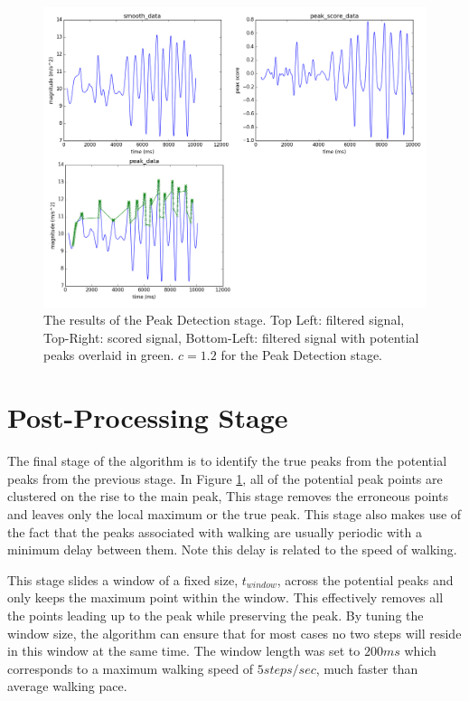             \begin{figure}[!th]
                \includegraphics[width=\textwidth]{Images/detection_stage.png}
                \centering
                \caption{The results of the Peak Detection stage. Top Left: filtered signal, Top-Right: scored signal, Bottom-Left: filtered signal with potential peaks overlaid in green. $c=1.2$ for the Peak Detection stage.}
                \label{img_detection_stage}
            \end{figure}

        \section{Post-Processing Stage}

            The final stage of the algorithm is to identify the true peaks from the potential peaks from the previous stage. In Figure \ref{img_detection_stage}, all of the potential peak points are clustered on the rise to the main peak, This stage removes the erroneous points and leaves only the local maximum or the true peak. This stage also makes use of the fact that the peaks associated with walking are usually periodic with a minimum delay between them. Note this delay is related to the speed of walking.

            This stage slides a window of a fixed size, $t_{window}$, across the potential peaks and only keeps the maximum point within the window. This effectively removes all the points leading up to the peak while preserving the peak. By tuning the window size, the algorithm can ensure that for most cases no two steps will reside in this window at the same time. The window length was set to $200ms$ which corresponds to a maximum walking speed of $5 steps/sec$, much faster than average walking pace.

